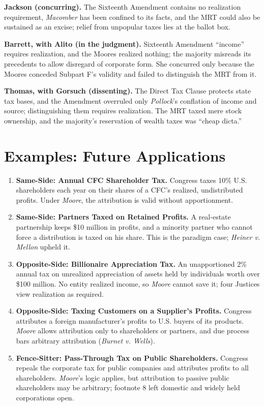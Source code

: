 \documentclass[12pt]{article}
\begin{document}
\textbf{Jackson (concurring).} The Sixteenth Amendment contains no realization requirement, \textit{Macomber} has been confined to its facts, and the MRT could also be sustained as an excise; relief from unpopular taxes lies at the ballot box.

\textbf{Barrett, with Alito (in the judgment).} Sixteenth Amendment ``income'' requires realization, and the Moores realized nothing; the majority misreads its precedents to allow disregard of corporate form. She concurred only because the Moores conceded Subpart F's validity and failed to distinguish the MRT from it.

\textbf{Thomas, with Gorsuch (dissenting).} The Direct Tax Clause protects state tax bases, and the Amendment overruled only \textit{Pollock}'s conflation of income and source; distinguishing them requires realization. The MRT taxed mere stock ownership, and the majority's reservation of wealth taxes was ``cheap dicta.''

\section{Examples: Future Applications}

\begin{enumerate}
\item \textbf{Same-Side: Annual CFC Shareholder Tax.} Congress taxes 10\% U.S. shareholders each year on their shares of a CFC's realized, undistributed profits. Under \textit{Moore}, the attribution is valid without apportionment.
\item \textbf{Same-Side: Partners Taxed on Retained Profits.} A real-estate partnership keeps \$10 million in profits, and a minority partner who cannot force a distribution is taxed on his share. This is the paradigm case; \textit{Heiner v. Mellon} upheld it.
\item \textbf{Opposite-Side: Billionaire Appreciation Tax.} An unapportioned 2\% annual tax on unrealized appreciation of assets held by individuals worth over \$100 million. No entity realized income, so \textit{Moore} cannot save it; four Justices view realization as required.
\item \textbf{Opposite-Side: Taxing Customers on a Supplier's Profits.} Congress attributes a foreign manufacturer's profits to U.S. buyers of its products. \textit{Moore} allows attribution only to shareholders or partners, and due process bars arbitrary attribution (\textit{Burnet v. Wells}).
\item \textbf{Fence-Sitter: Pass-Through Tax on Public Shareholders.} Congress repeals the corporate tax for public companies and attributes profits to all shareholders. \textit{Moore}'s logic applies, but attribution to passive public shareholders may be arbitrary; footnote 8 left domestic and widely held corporations open.
\end{enumerate}
\end{document}
